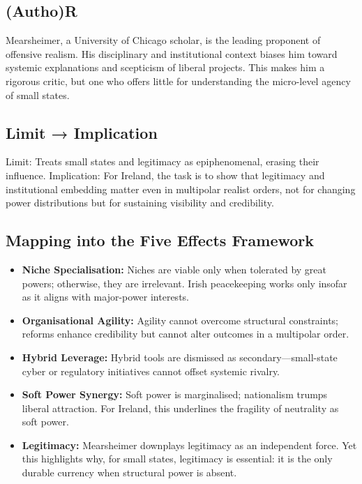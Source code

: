 \subsection*{(Autho)R}
Mearsheimer, a University of Chicago scholar, is the leading proponent of offensive realism. His disciplinary and institutional context biases him toward systemic explanations and scepticism of liberal projects. This makes him a rigorous critic, but one who offers little for understanding the micro-level agency of small states.

\subsection*{Limit → Implication}
Limit: Treats small states and legitimacy as epiphenomenal, erasing their influence.  
Implication: For Ireland, the task is to show that legitimacy and institutional embedding matter even in multipolar realist orders, not for changing power distributions but for sustaining visibility and credibility.

\subsection*{Mapping into the Five Effects Framework}

\begin{itemize}
	\item \textbf{Niche Specialisation:} Niches are viable only when tolerated by great powers; otherwise, they are irrelevant. Irish peacekeeping works only insofar as it aligns with major-power interests.
	\item \textbf{Organisational Agility:} Agility cannot overcome structural constraints; reforms enhance credibility but cannot alter outcomes in a multipolar order.
	\item \textbf{Hybrid Leverage:} Hybrid tools are dismissed as secondary—small-state cyber or regulatory initiatives cannot offset systemic rivalry.
	\item \textbf{Soft Power Synergy:} Soft power is marginalised; nationalism trumps liberal attraction. For Ireland, this underlines the fragility of neutrality as soft power.
	\item \textbf{Legitimacy:} Mearsheimer downplays legitimacy as an independent force. Yet this highlights why, for small states, legitimacy is essential: it is the only durable currency when structural power is absent.
\end{itemize}

